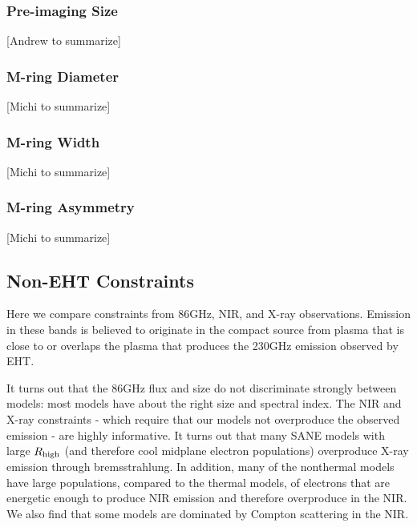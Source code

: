 \subsubsection{Pre-imaging Size}

[Andrew to summarize]

\subsubsection{M-ring Diameter}

[Michi to summarize]

\subsubsection{M-ring Width}

[Michi to summarize]

\subsubsection{M-ring Asymmetry}

[Michi to summarize]

\subsection{Non-EHT Constraints}

Here we compare constraints from 86GHz, NIR, and X-ray observations.  Emission in these bands is believed to originate in the compact source from plasma that is close to or overlaps the plasma that produces the 230GHz emission observed by EHT.

It turns out that the 86GHz flux and size do not discriminate strongly between models: most models have about the right size and spectral index.  The NIR and X-ray constraints - which require that our models not overproduce the observed emission - are highly informative.  It turns out that many SANE models with large ${R_\mathrm{high}}$ (and therefore cool midplane electron populations) overproduce X-ray emission through bremsstrahlung.  In addition, many of the nonthermal models have large populations, compared to the thermal models, of electrons that are energetic enough to produce NIR emission and therefore overproduce in the NIR.   We also find that some models are dominated by Compton scattering in the NIR.

